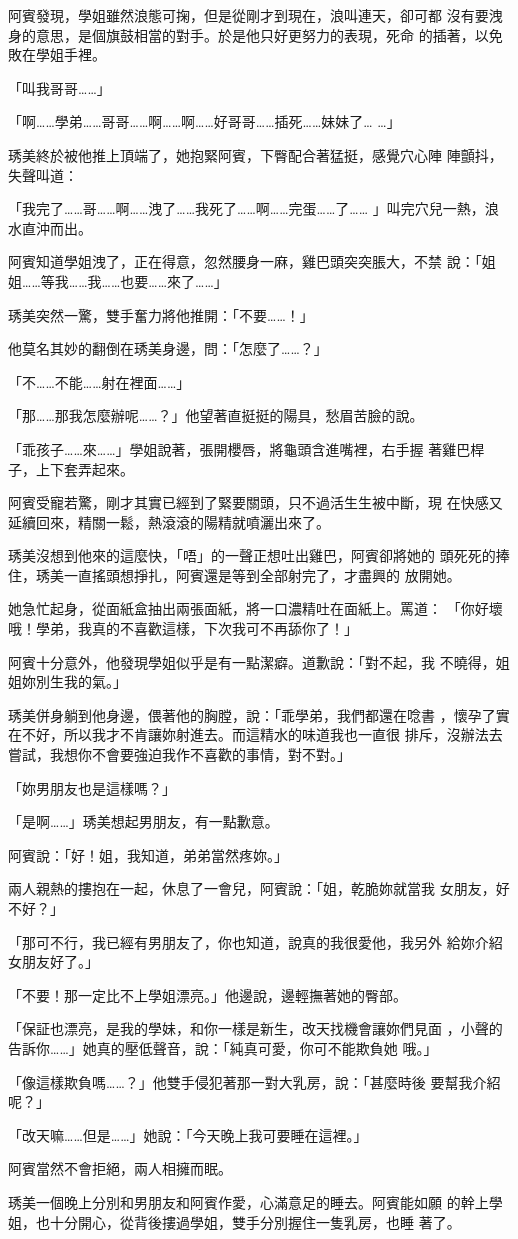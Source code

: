 阿賓發現，學姐雖然浪態可掬，但是從剛才到現在，浪叫連天，卻可都
沒有要洩身的意思，是個旗鼓相當的對手。於是他只好更努力的表現，死命
的插著，以免敗在學姐手裡。

「叫我哥哥……」

「啊……學弟……哥哥……啊……啊……好哥哥……插死……妹妹了…
…」

琇美終於被他推上頂端了，她抱緊阿賓，下臀配合著猛挺，感覺穴心陣
陣顫抖，失聲叫道：

「我完了……哥……啊……洩了……我死了……啊……完蛋……了……
」叫完穴兒一熱，浪水直沖而出。

阿賓知道學姐洩了，正在得意，忽然腰身一麻，雞巴頭突突脹大，不禁
說：「姐姐……等我……我……也要……來了……」

琇美突然一驚，雙手奮力將他推開：「不要……！」

他莫名其妙的翻倒在琇美身邊，問：「怎麼了……？」

「不……不能……射在裡面……」

「那……那我怎麼辦呢……？」他望著直挺挺的陽具，愁眉苦臉的說。

「乖孩子……來……」學姐說著，張開櫻唇，將龜頭含進嘴裡，右手握
著雞巴桿子，上下套弄起來。

阿賓受寵若驚，剛才其實已經到了緊要關頭，只不過活生生被中斷，現
在快感又延續回來，精關一鬆，熱滾滾的陽精就噴灑出來了。

琇美沒想到他來的這麼快，「唔」的一聲正想吐出雞巴，阿賓卻將她的
頭死死的捧住，琇美一直搖頭想掙扎，阿賓還是等到全部射完了，才盡興的
放開她。

她急忙起身，從面紙盒抽出兩張面紙，將一口濃精吐在面紙上。罵道：
「你好壞哦！學弟，我真的不喜歡這樣，下次我可不再舔你了！」

阿賓十分意外，他發現學姐似乎是有一點潔癖。道歉說：「對不起，我
不曉得，姐姐妳別生我的氣。」

琇美併身躺到他身邊，偎著他的胸膛，說：「乖學弟，我們都還在唸書
，懷孕了實在不好，所以我才不肯讓妳射進去。而這精水的味道我也一直很
排斥，沒辦法去嘗試，我想你不會要強迫我作不喜歡的事情，對不對。」

「妳男朋友也是這樣嗎？」

「是啊……」琇美想起男朋友，有一點歉意。

阿賓說：「好！姐，我知道，弟弟當然疼妳。」

兩人親熱的摟抱在一起，休息了一會兒，阿賓說：「姐，乾脆妳就當我
女朋友，好不好？」

「那可不行，我已經有男朋友了，你也知道，說真的我很愛他，我另外
給妳介紹女朋友好了。」

「不要！那一定比不上學姐漂亮。」他邊說，邊輕撫著她的臀部。

「保証也漂亮，是我的學妹，和你一樣是新生，改天找機會讓妳們見面
，小聲的告訴你……」她真的壓低聲音，說：「純真可愛，你可不能欺負她
哦。」

「像這樣欺負嗎……？」他雙手侵犯著那一對大乳房，說：「甚麼時後
要幫我介紹呢？」

「改天嘛……但是……」她說：「今天晚上我可要睡在這裡。」

阿賓當然不會拒絕，兩人相擁而眠。

琇美一個晚上分別和男朋友和阿賓作愛，心滿意足的睡去。阿賓能如願
的幹上學姐，也十分開心，從背後摟過學姐，雙手分別握住一隻乳房，也睡
著了。










